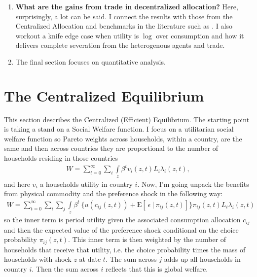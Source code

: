 \documentclass[12pt,pdftex]{article}
\begin{document}
\begin{onehalfspacing}
\begin{enumerate}
\item \textbf{What are the gains from trade in decentralized allocation?} Here, surprisingly, a lot can be said. I connect the results with those from the Centralized Allocation and benchmarks in the literature such as \citet{arkolakis2012new}. I also workout a knife edge case when utility is $\log$ over consumption and how it delivers complete severation from the heterogenous agents and trade.
    
\item The final section focuses on quantitative analysis. 
\end{enumerate}

\section{The Centralized Equilibrium}

This section describes the Centralized (Efficient) Equilibrium. The starting point is taking a stand on a Social Welfare function. I focus on a utilitarian social welfare function so Pareto weights across households, within a country, are the same and then across countries they are proportional to the number of households residing in those countries
\begin{align}
W = \sum_{t=0}^{\infty} \sum_{i} \int\limits_{z} \beta^{t} v_{i}(z,t) L_{i}\lambda_{i}(z,t),
\nonumber
\end{align}
and here $v_i$ a households utility in country $i$. Now, I'm going unpack the benefits from physical commodity and the preference shock in the following way:
\begin{align}
W = \sum_{t=0}^{\infty}  \sum_{i} \sum_{j} \int\limits_{z}  \beta^{t} \  \bigg \{  u(c_{ij}(z, t) ) + \mathrm{E}[ \ \epsilon \ | \ \pi_{ij}(z,t) ] \bigg \}\pi_{ij}(z,t) L_{i} \lambda_{i}(z, t)
\label{eq:social-welfare-2}
\end{align}
so the inner term is period utility given the associated consumption allocation $c_{ij}$ and then the expected value of the preference shock conditional on the choice probability $\pi_{ij}(z,t)$. This inner term is then weighted by the number of households that receive that utility, i.e. the choice probability times the mass of households with shock $z$ at date $t$. The sum across $j$ adds up all households in country $i$. Then the sum across $i$ reflects that this is global welfare.


\end{onehalfspacing}
\end{document}
